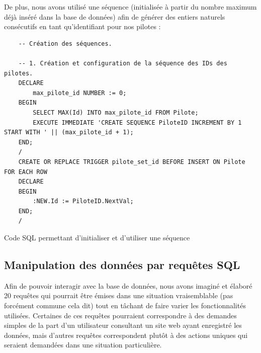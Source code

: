 \documentclass[12pt,a4paper]{article}
\newenvironment{code}{\captionsetup{type=listing}}{}
\begin{document}
De plus, nous avons utilisé une séquence (initialisée à partir du nombre maximum
déjà inséré dans la base de données) afin de générer des entiers naturels
consécutifs en tant qu'identifiant pour nos pilotes :

\begin{code}
    \begin{verbatim}
    -- Création des séquences.

    -- 1. Création et configuration de la séquence des IDs des pilotes.
    DECLARE
        max_pilote_id NUMBER := 0;
    BEGIN
        SELECT MAX(Id) INTO max_pilote_id FROM Pilote;
        EXECUTE IMMEDIATE 'CREATE SEQUENCE PiloteID INCREMENT BY 1 START WITH ' || (max_pilote_id + 1);
    END;
    /
    CREATE OR REPLACE TRIGGER pilote_set_id BEFORE INSERT ON Pilote FOR EACH ROW
    DECLARE
    BEGIN
        :NEW.Id := PiloteID.NextVal;
    END;
    /
    \end{verbatim}
    \caption{Code SQL permettant d'initialiser et d'utiliser une séquence}
    \label{lst.seq}
\end{code}

\subsection{Manipulation des données par requêtes SQL}
\label{sub.req}

Afin de pouvoir interagir avec la base de données, nous avons imaginé et élaboré
20 requêtes qui pourrait être émises dans une situation vraisemblable (pas
forcément commune cela dit) tout en tâchant de faire varier les fonctionnalités
utilisées. Certaines de ces requêtes pourraient correspondre à des demandes
simples de la part d'un utilisateur consultant un site web ayant enregistré les
données, mais d'autres requêtes correspondent plutôt à des actions uniques qui
seraient demandées dans une situation particulière.
\end{document}
